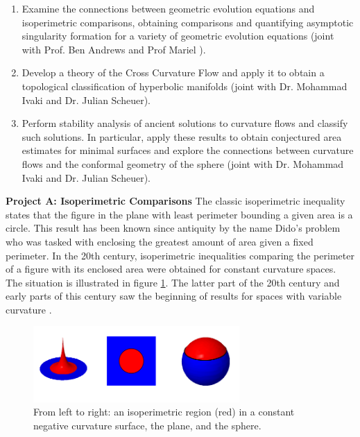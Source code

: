 \documentclass[12pt]{amsart}
\begin{document}
\begin{enumerate}[label=\textbf{(\Alph*)}]
\item Examine the connections between geometric evolution equations and isoperimetric comparisons, obtaining comparisons and quantifying asymptotic singularity formation for a variety of geometric evolution equations (joint with Prof. Ben Andrews and Prof Mariel \saez{}).
\item Develop a theory of the Cross Curvature Flow and apply it to obtain a topological classification of hyperbolic manifolds (joint with Dr. Mohammad Ivaki and Dr. Julian Scheuer).
\item Perform stability analysis of ancient solutions to curvature flows and classify such solutions. In particular, apply these results to obtain conjectured area estimates for minimal surfaces and explore the connections between curvature flows and the conformal geometry of the sphere (joint with Dr. Mohammad Ivaki and Dr. Julian Scheuer).
\end{enumerate}

\noindent\textbf{Project A: Isoperimetric Comparisons}
\label{sec:orgheadline2}
The classic isoperimetric inequality states that the figure in the plane with least perimeter bounding a given area is a circle. This result has been known since antiquity by the name Dido's problem who was tasked with enclosing the greatest amount of area given a fixed perimeter. In the 20th century, isoperimetric inequalities comparing the perimeter of a figure with its enclosed area were obtained for constant curvature spaces. The situation is illustrated in figure \ref{fg:const_curve_isoperimetric}. The latter part of the 20th century and early parts of this century saw the beginning of results for spaces with variable curvature \cite{MR1699261,MR1661278,MR1883725}.

\begin{figure}[htb]
\centering
\includegraphics[width=0.7\textwidth]{img/const_curve.png}
\caption{\label{fg:const_curve_isoperimetric} From left to right: an isoperimetric region (red) in a constant negative curvature surface, the plane, and the sphere.}
\end{figure}
\end{document}
